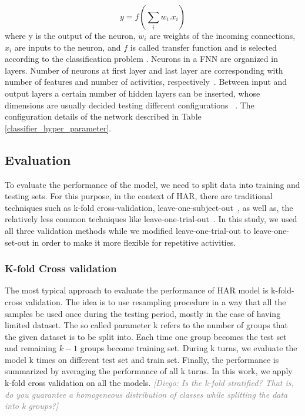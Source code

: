 \documentclass[journal,article,submit,moreauthors,pdftex]{Definitions/mdpi}
\newcommand{\diego}[1]{\textcolor{gray}{{\it [Diego: #1]}}}
\begin{document}
\begin{equation}
\label{fnn_formula}
 y = f(\sum_{i}^{}w_{i}.x_{i})
\end{equation}
where y is the output of the neuron, $ w_{i} $ are weights of the incoming connections, $ x_i $ are inputs to the neuron, and $f$ is called transfer function and is selected according to the classification problem \cite{zhang1999geometrical}. Neurons in a FNN are organized in layers. Number of neurons at first layer and last layer are corresponding with number of features and number of activities, respectively~\cite{baldominos2019comparison}. Between input and output layers a certain number of hidden layers can be inserted, whose dimensions are usually decided testing different configurations ~\cite{baldominos2019comparison}. The configuration details of the network described in Table \ref{classifier_hyper_parameter}.

\subsection{Evaluation}
To evaluate the performance of the model, we need to split data into training and testing sets. For this purpose, in the context of HAR, there are traditional techniques such as k-fold cross-validation, leave-one-subject-out~\cite{jordao2018human}, as well as, the relatively less common techniques like leave-one-trial-out~\cite{sena2018multiscale}. In this study, we used all three validation methods while we modified leave-one-trial-out to leave-one-set-out in order to make it more flexible for repetitive activities. 

\subsubsection{K-fold Cross validation}
The most typical approach to evaluate the performance of HAR model is k-fold-cross validation. The idea is to use resampling procedure in a way that all the samples be used once during the testing period, mostly in the case of having limited dataset. The so called parameter k refers to the number of groups that the given dataset is to be split into. Each time one group becomes the test set and remaining $k-1$ groups become training set. During k turns, we evaluate the model k times on different test set and train set. Finally, the performance is summarized by averaging the performance of all k turns. In this work, we apply k-fold cross validation on all the models. 
\diego{Is the k-fold stratified? That is, do you guarantee a homogeneous distribution of classes while splitting the data into k groups?}
\end{document}
